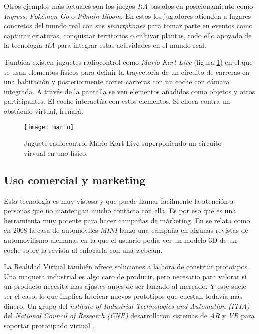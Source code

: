 Otros ejemplos más actuales son los juegos \textit{RA} basados en posicionamiento como \textit{Ingress}, \textit{Pokémon Go} o \textit{Pikmin Bloom}. En estos los jugadores atienden a lugares concretos del mundo real con sus \textit{smartphones} para tomar parte en eventos como capturar criaturas, conquistar territorios o cultivar plantas, todo ello apoyado de la tecnología \textit{RA} para integrar estas actividades en el mundo real.

También existen juguetes radiocontrol como \textit{Mario Kart Live} (figura \ref{fig:mario})  en el que se usan elementos físicos para definir la trayectoria de un circuito de carreras en una habitación y posteriormente correr carreras con un coche con cámara integrada. A través de la pantalla se ven elementos añadidos como objetos y otros participantes. El coche interactúa con estos elementos. Si choca contra un obstáculo virtual, frenará.

\begin{figure}[h]
    \centering
    \texttt{[image: mario]}
    \caption[Mario Kart Live]{Juguete radiocontrol Mario Kart Live superponiendo un circuito virvual en uno físico.}
    \label{fig:mario}
\end{figure}

\subsection*{Uso comercial y marketing}

Esta tecnología es muy vistosa y que puede llamar facilmente la atención a personas que no mantengan mucho contacto con ella. Es por eso que es una herramienta muy potente para hacer campañas de márketing. En \cite{agtech} se relata como en 2008 la casa de automóviles \textit{MINI} lanzó una campaña en algunas revistas de automovilismo alemanas en la que el usuario podía ver un modelo 3D de un coche sobre la revista al enfocarla con una webcam.

La Realidad Virtual también ofrece soluciones a la hora de construir prototipos. Una maqueta industrial es algo caro de producir, pero necesario para valorar si un producto necesita más ajustes antes de ser lanzado al mercado. Y este suele ser el caso, lo que implica fabricar nuevos prototipos que cuestan todavía más dinero. Un grupo del \textit{nstitute of Industrial Technologies and Automation (ITIA)} del \textit{National Council of Research (CNR)} desarrollaron sistemas de \textit{AR} y \textit{VR} para soportar prototipado virtual \cite{agtech}.

